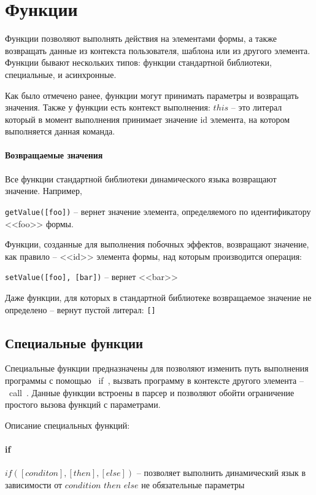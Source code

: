 \documentclass[../index.tex]{subfiles}
\begin{document}
\label{sec:functions}
\section{Функции}

Функции позволяют выполнять действия на элементами формы, а также 
возвращать данные из контекста пользователя, шаблона или из другого элемента. 
Функции бывают нескольких типов: функции стандартной библиотеки, специальные, и асинхронные.

Как было отмечено ранее, функции могут принимать параметры и возвращать значения. 
Также у функции есть контекст выполнения: $this$ -- это литерал который в момент выполнения принимает значение id 
элемента, на котором выполняется данная команда.

\paragraph{Возвращаемые значения}

Все функции стандартной библиотеки динамического языка возвращают значение. Например,

\verb|getValue([foo])| -- вернет значение элемента, определяемого по идентификатору <<foo>> формы.

Функции, созданные для выполнения побочных эффектов, возвращают значение, как правило -- <<id>> элемента формы, над которым производится операция:

\verb|setValue([foo], [bar])| -- вернет <<bar>>

Даже функции, для которых в стандартной библиотеке возвращаемое значение не определено -- вернут пустой литерал: \verb|[]|


\subsection{Специальные функции}
Специальные функции предназначены для позволяют изменить путь выполнения программы с помощью ~if~, 
вызвать программу в контексте другого элемента -- ~call~.
Данные функции встроены в парсер и позволяют обойти ограничение простого вызова функций с параметрами.

Описание специальных функций:

\label{p:if}
\paragraph{if}
$if([conditon], [then], [else])$ -- позволяет выполнить динамический язык в зависимости от $condition$
$then$ $else$ не обязательные параметры
\end{document}
